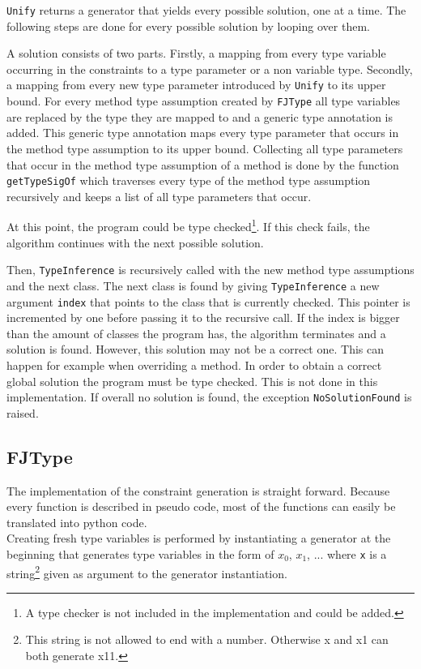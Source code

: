 \verb|Unify| returns a generator that yields every possible solution, one at a time. The following steps are done for every possible solution by looping over them.

A solution consists of two parts. Firstly, a mapping from every type variable occurring in the constraints to a type parameter or a non variable type. Secondly, a mapping from every new type parameter introduced by \verb|Unify| to its upper bound.
For every method type assumption created by \verb|FJType| all type variables are replaced by the type they are mapped to and
a generic type annotation is added. This generic type annotation maps every type parameter that occurs in the method type assumption to its upper bound.
Collecting all type parameters that occur in the method type assumption of a method is done by the function \verb|getTypeSigOf| which traverses every type of the method type assumption recursively and keeps a list of all type parameters that occur.

At this point, the program could be type checked\footnote{A type checker is not included in the implementation and could be added.}. If this check fails, the algorithm continues with the next possible solution.

Then, \verb|TypeInference| is recursively called with the new method type assumptions and the next class.
The next class is found by giving \verb|TypeInference| a new argument \verb|index| that points to the class that is currently checked. This pointer is incremented by one before passing it to the recursive call.
If the index is bigger than the amount of classes the program has, the algorithm terminates and a solution is found.
However, this solution may not be a correct one. This can happen for example when overriding a method. In order to obtain a correct global solution
the program must be type checked. This is not done in this implementation.
If overall no solution is found, the exception \verb|NoSolutionFound| is raised.

\subsection{FJType}
The implementation of the constraint generation is straight forward. Because every function is described in pseudo code, most of the functions can easily be translated into python code. \\
Creating fresh type variables is performed by instantiating a generator at the beginning that generates type variables in the form of $x_0$, $x_1$, ... where \verb|x| is a string\footnote{This string is not allowed to end with a number. Otherwise x and x1 can both generate x11.} given as argument to the generator instantiation. \\


